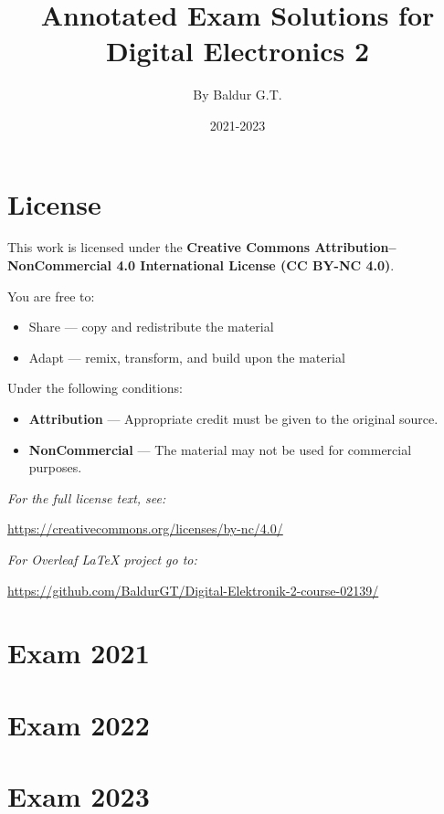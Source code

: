 \documentclass{article}
\title{Annotated Exam Solutions for Digital Electronics 2}
\author{By Baldur G.T.}
\date{2021-2023}
\begin{document}
\maketitle

\tableofcontents
\thispagestyle{empty}

\newpage

\section{License}
This work is licensed under the
\textbf{Creative Commons Attribution--NonCommercial 4.0
International License (CC BY-NC 4.0)}.

You are free to:

\begin{itemize}
    \item Share --- copy and redistribute the material
    \item Adapt --- remix, transform, and build upon the material
\end{itemize}

Under the following conditions:

\begin{itemize}
    \item \textbf{Attribution} --- Appropriate credit must be given to the original source.
    \item \textbf{NonCommercial} --- The material may not be used for commercial purposes.
\end{itemize}

\textit{For the full license text, see:}

\url{https://creativecommons.org/licenses/by-nc/4.0/}

\vspace{5.0mm}
\textit{For Overleaf LaTeX project go to:}

\url{https://github.com/BaldurGT/Digital-Elektronik-2-course-02139/}

\newpage
\setcounter{page}{1}

\section{Exam 2021}


\newpage
\section{Exam 2022}


\newpage
\section{Exam 2023}


%
\end{document}

